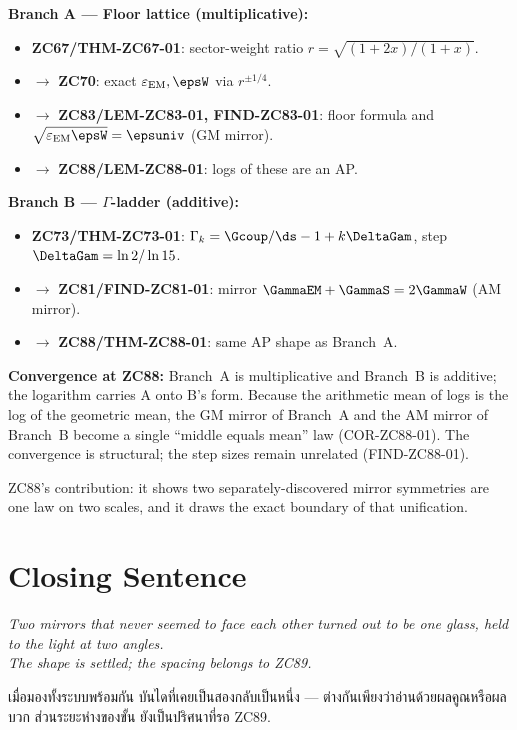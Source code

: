 \documentclass[12pt, a4paper]{article}
\renewcommand{\epsEM}{\varepsilon_{\rm EM}}     %
\begin{document}
\begin{genealogybox}[title={How ZC88's Key Objects Trace Back}]

\textbf{Branch A --- Floor lattice (multiplicative):}
\begin{itemize}[leftmargin=2em, noitemsep]
  \item \textbf{ZC67/THM-ZC67-01}: sector-weight ratio
    $r=\sqrt{(1+2x)/(1+x)}$.
  \item $\to$ \textbf{ZC70}: exact $\epsEM,\epsW$ via $r^{\pm1/4}$.
  \item $\to$ \textbf{ZC83/LEM-ZC83-01, FIND-ZC83-01}: floor formula
    and $\sqrt{\epsEM\epsW}=\epsuniv$ (GM mirror).
  \item $\to$ \textbf{ZC88/LEM-ZC88-01}: logs of these are an AP.
\end{itemize}

\textbf{Branch B --- $\Gamma$-ladder (additive):}
\begin{itemize}[leftmargin=2em, noitemsep]
  \item \textbf{ZC73/THM-ZC73-01}: $\Gamma_k=\Gcoup/\ds-1+k\DeltaGam$,
    step $\DeltaGam=\ln2/\ln15$.
  \item $\to$ \textbf{ZC81/FIND-ZC81-01}: mirror
    $\GammaEM+\GammaS=2\GammaW$ (AM mirror).
  \item $\to$ \textbf{ZC88/THM-ZC88-01}: same AP shape as Branch~A.
\end{itemize}

\textbf{Convergence at ZC88:}
Branch~A is multiplicative and Branch~B is additive; the logarithm carries
A onto B's form. Because the arithmetic mean of logs is the log of the
geometric mean, the GM mirror of Branch~A and the AM mirror of Branch~B
become a single ``middle equals mean'' law (COR-ZC88-01). The convergence
is structural; the step sizes remain unrelated (FIND-ZC88-01).

ZC88's contribution: it shows two separately-discovered mirror symmetries
are one law on two scales, and it draws the exact boundary of that unification.
\end{genealogybox}

\section{Closing Sentence}

\bigskip
\begin{center}
\textit{%
  Two mirrors that never seemed to face each other turned out to be one
  glass, held to the light at two angles.\\[0.3em]
  The shape is settled; the spacing belongs to ZC89.
}

\medskip
{\thaifont
เมื่อมองทั้งระบบพร้อมกัน บันไดที่เคยเป็นสองกลับเป็นหนึ่ง ---
ต่างกันเพียงว่าอ่านด้วยผลคูณหรือผลบวก
ส่วนระยะห่างของขั้น ยังเป็นปริศนาที่รอ ZC89.}
\end{center}
\end{document}
